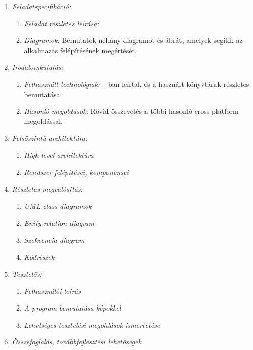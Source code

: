 \begin{enumerate}
	\item \emph{Feladatspecifikáció: } 
        \begin{enumerate}
            \item \emph{Feladat részletes leírása: } 
            \item \emph{Diagramok: } Bemutatok néhány diagramot és ábrát, amelyek segítik az alkalmazás felépítésének megértését.
        \end{enumerate}
	\item \emph{Irodalomkutatás:} 
        \begin{enumerate}
            \item \emph{Felhasznált technológiák:} \az+ban leírtak és a használt könyvtárak részletes bemutatása 
            \item \emph{Hasonló megoldások:} Rövid összevetés a többi hasonló cross-platform megoldással.
        \end{enumerate}
    \item \emph{Felsőszintű architektúra:} 
        \begin{enumerate}
            \item \emph{High level architektúra} 
            \item \emph{Rendszer felépítései, komponensei}
        \end{enumerate}
    \item \emph{Részletes megvalósítás:} 
        \begin{enumerate}
            \item \emph{UML class diagramok} 
            \item \emph{Enity-relation diagram}
            \item \emph{Szekvencia diagram}
            \item \emph{Kódrészek}
        \end{enumerate}
    \item \emph{Tesztelés:} 
        \begin{enumerate}
            \item \emph{Felhasználói leírás} 
            \item \emph{A program bemutatása képekkel} 
            \item \emph{Lehetséges tesztelési megoldások ismertetése}
        \end{enumerate}
    \item \emph{Összefoglalás, továbbfejlesztési lehetőségek} 
\end{enumerate}